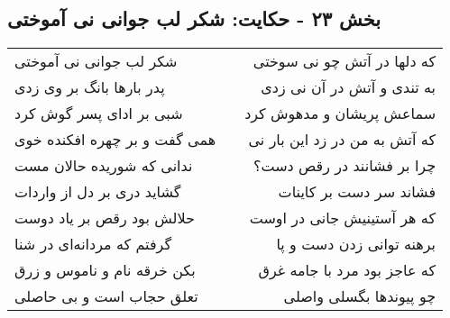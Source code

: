 \begin{center}
\section*{بخش ۲۳ - حکایت: شکر لب جوانی نی آموختی}
\label{sec:023}
\begin{longtable}{l p{0.5cm} r}
شکر لب جوانی نی آموختی
&&
که دلها در آتش چو نی سوختی
\\
پدر بارها بانگ بر وی زدی
&&
به تندی و آتش در آن نی زدی
\\
شبی بر ادای پسر گوش کرد
&&
سماعش پریشان و مدهوش کرد
\\
همی گفت و بر چهره افکنده خوی
&&
که آتش به من در زد این بار نی
\\
ندانی که شوریده حالان مست
&&
چرا بر فشانند در رقص دست؟
\\
گشاید دری بر دل از واردات
&&
فشاند سر دست بر کاینات
\\
حلالش بود رقص بر یاد دوست
&&
که هر آستینیش جانی در اوست
\\
گرفتم که مردانه‌ای در شنا
&&
برهنه توانی زدن دست و پا
\\
بکن خرقه نام و ناموس و زرق
&&
که عاجز بود مرد با جامه غرق
\\
تعلق حجاب است و بی حاصلی
&&
چو پیوندها بگسلی واصلی
\\
\end{longtable}
\end{center}
